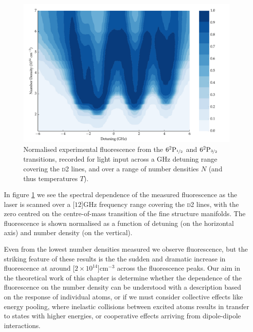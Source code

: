     \begin{figure}[]
    \includegraphics[width=\linewidth]
      {figs/05_twophoton/plot_blue_flourescence_fig1.pdf}
    \caption{
    Normalised experimental fluorescence from the
    $6^2\mathrm{P}_{\nicefrac{1}{2}}$ and $6^2\mathrm{P}_{\nicefrac{3}{2}}$
    transitions, recorded for light input across a GHz detuning range covering
    the \textsc{d2} lines, and over a range of number densities $N$ (and thus
    temperatures $T$).
    } 
    \label{fig:blue_flourescence} 
    \end{figure}

    In figure \ref{fig:blue_flourescence} we see the spectral dependence of the
    measured fluorescence as the laser is scanned over a \unit[$12$]{GHz}
    frequency range covering the \textsc{d2} lines, with the zero centred on the
    centre-of-mass transition of the fine structure manifolds. The fluorescence
    is shown normalised as a function of detuning (on the horizontal axis) and
    number density (on the vertical).

    Even from the lowest number densities measured we observe fluorescence, but
    the striking feature of these results is the the sudden and dramatic
    increase in fluorescence at around \unit[$2\times10^{14}$]{cm$^{-3}$} across
    the fluorescence peaks. Our aim in the theoretical work of this chapter is
    determine whether the dependence of the fluorescence on the number density
    can be understood with a description based on the response of individual
    atoms, or if we must consider collective effects like energy
    pooling\cite{Bearman1978,Hill1979,Namiotka1997}, where inelastic collisions
    between excited atoms results in transfer to states with higher energies, or
    cooperative effects arriving from dipole-dipole
    interactions\cite{Keaveney2012a,Weller2011}.
